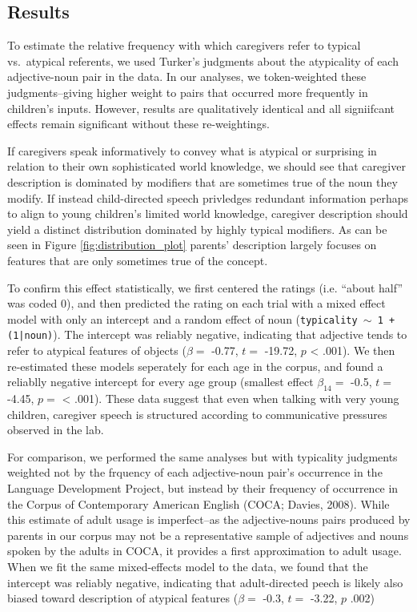 \documentclass[10pt, letterpaper]{article}
\begin{document}
\hypertarget{results}{%
\subsection{Results}\label{results}}

To estimate the relative frequency with which caregivers refer to
typical vs.~atypical referents, we used Turker's judgments about the
atypicality of each adjective-noun pair in the data. In our analyses, we
token-weighted these judgments--giving higher weight to pairs that
occurred more frequently in children's inputs. However, results are
qualitatively identical and all signiifcant effects remain significant
without these re-weightings.

If caregivers speak informatively to convey what is atypical or
surprising in relation to their own sophisticated world knowledge, we
should see that caregiver description is dominated by modifiers that are
sometimes true of the noun they modify. If instead child-directed speech
privledges redundant information perhaps to align to young children's
limited world knowledge, caregiver description should yield a distinct
distribution dominated by highly typical modifiers. As can be seen in
Figure \ref{fig:distribution_plot} parents' description largely focuses
on features that are only sometimes true of the concept.

To confirm this effect statistically, we first centered the ratings
(i.e. ``about half'' was coded 0), and then predicted the rating on each
trial with a mixed effect model with only an intercept and a random
effect of noun (\texttt{typicality $\sim$ 1 + (1|noun)}). The intercept
was reliably negative, indicating that adjective tends to refer to
atypical features of objects (\(\beta =\) -0.77, \(t =\) -19.72, \(p\)
\textless{} .001). We then re-estimated these models seperately for each
age in the corpus, and found a reliablly negative intercept for every
age group (smallest effect \(\beta_{14} =\) -0.5, \(t =\) -4.45, \(p =\)
\textless{} .001). These data suggest that even when talking with very
young children, caregiver speech is structured according to
communicative pressures observed in the lab.

For comparison, we performed the same analyses but with typicality
judgments weighted not by the frquency of each adjective-noun pair's
occurrence in the Language Development Project, but instead by their
frequency of occurrence in the Corpus of Contemporary American English
(COCA; Davies, 2008). While this estimate of adult usage is
imperfect--as the adjective-nouns pairs produced by parents in our
corpus may not be a representative sample of adjectives and nouns spoken
by the adults in COCA, it provides a first approximation to adult usage.
When we fit the same mixed-effects model to the data, we found that the
intercept was reliably negative, indicating that adult-directed peech is
likely also biased toward description of atypical features (\(\beta =\)
-0.3, \(t =\) -3.22, \(p\) .002)
\end{document}
